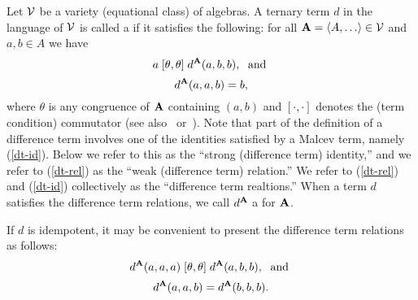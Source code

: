Let $\mathcal{V}$ be a variety (equational class) of algebras.
A ternary term $d$ in the language of $\mathcal{V}$ is called 
a  if it satisfies the following:
for all $\bA = \<A, \dots \> \in \sV$ and $a, b \in A$ we have
\begin{equation}
  \label{dt-rel}
  a \mathrel{[\theta, \theta]} d^{\mathbf{A}}(a,b,b), \; \text{ and }
\end{equation}
\begin{equation}
  \label{dt-id}
d^{\mathbf{A}}(a,a,b) = b, 
\end{equation}
where $\theta$ is any congruence of $\mathbf{A}$
containing $(a,b)$
and $[\cdot, \cdot]$ denotes the (term condition) commutator
(see also~\cite{HM:1988} or~\cite{MR3076179}).
Note that part of
the definition of a difference term involves one of
the identities satisfied by a Malcev term, namely
(\ref{dt-id}). Below we refer to this as the ``strong (difference term) identity,''
and we refer to (\ref{dt-rel}) as the ``weak (difference term) relation.''
We refer to (\ref{dt-rel}) and (\ref{dt-id}) collectively as the ``difference term
realtions.''
When a term $d$ satisfies the difference term relations, we call $d^{\mathbf{A}}$
a  for $\mathbf{A}$.

If $d$ is idempotent, it may be convenient to present the difference term
relations as follows:
\begin{equation}
  \label{dt-rel-idemp}
  d^{\mathbf{A}}(a,a,a) \mathrel{[\theta, \theta]} d^{\mathbf{A}}(a,b,b), \; \text{ and }
\end{equation}
\begin{equation}
  \label{dt-id-idemp}
d^{\mathbf{A}}(a,a,b) =   d^{\mathbf{A}}(b,b,b).
\end{equation}

